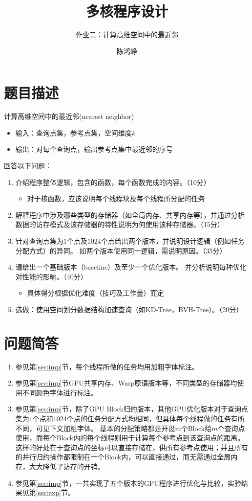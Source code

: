 \documentclass[logo,reportComp]{thesis}
\title{多核程序设计}
\subtitle{作业二：计算高维空间中的最近邻}
\author{陈鸿峥}
\def\globalmem{\textcolor{black}{\kaiti 全局内存}}
\def\sharedmem{\textcolor{red}{\kaiti 共享内存}}
\begin{document}
\maketitle
\tableofcontents

\newpage

\section{题目描述}
计算高维空间中的最近邻(nearest neighbor)
\begin{itemize}
	\item 输入：查询点集，参考点集，空间维度$k$
	\item 输出：对每个查询点，输出参考点集中最近邻的序号
\end{itemize}

回答以下问题：
\begin{enumerate}
	\item 介绍程序整体逻辑，包含的函数，每个函数完成的内容。（10分）
	\begin{itemize}
		\item 对于核函数，应该说明每个线程块及每个线程所分配的任务
	\end{itemize}
	\item 解释程序中涉及哪些类型的存储器（如全局内存、共享内存等），并通过分析数据的访存模式及该存储器的特性说明为何使用该种存储器。（15分）
	\item 针对查询点集为$1$个点及$1024$个点给出两个版本，并说明设计逻辑（例如任务分配方式）的异同。
	如两个版本使用同一逻辑，需说明原因。（35分）
	\item 请给出一个基础版本（baseline）及至少一个优化版本。
	并分析说明每种优化对性能的影响。（40分）
	\begin{itemize}
		\item 具体得分根据优化难度（技巧及工作量）而定
	\end{itemize}
	\item 选做：使用空间划分数据结构加速查询（如KD-Tree，BVH-Tree）。（20分）
\end{enumerate}

\section{问题简答}
\begin{enumerate}
	\item 参见第\ref{sec:imp}节，每个线程所做的任务均用加粗字体标注。
	\item 参见第\ref{sec:imp}节GPU共享内存、Warp原语版本等，不同类型的存储器均使用不同颜色字体进行标注。
	\item 参见第\ref{sec:imp}节，除了GPU Block归约版本，其他GPU优化版本对于查询点集为$1$个点和$1024$个点的任务分配方式均相同，但具体每个线程做的任务有所不同，可见下文加粗字体。
	基本的分配策略都是开设$m$个Block给$m$个查询点使用，而每个Block内的每个线程则用于计算每个参考点到该查询点的距离。
	这样的好处在于查询点的坐标可以直接存储在，供所有参考点使用；并且所有的并行归约操作都限制在一个Block内，可以直接通过，而无需通过\globalmem，大大降低了访存的开销。
	\item 参见第\ref{sec:imp}节，一共实现了五个版本的GPU程序进行优化与比较，实验结果见第\ref{sec:exp}节。
\end{enumerate}
\end{document}
